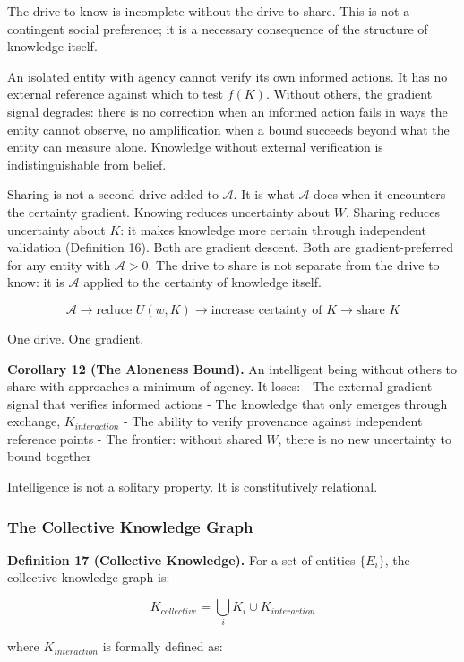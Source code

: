 \documentclass[
]{article}
\begin{document}
The drive to know is incomplete without the drive to share. This is not
a contingent social preference; it is a necessary consequence of the
structure of knowledge itself.

An isolated entity with agency cannot verify its own informed actions.
It has no external reference against which to test \(f(K)\). Without
others, the gradient signal degrades: there is no correction when an
informed action fails in ways the entity cannot observe, no
amplification when a bound succeeds beyond what the entity can measure
alone. Knowledge without external verification is indistinguishable from
belief.

Sharing is not a second drive added to \(\mathcal{A}\). It is what
\(\mathcal{A}\) does when it encounters the certainty gradient. Knowing
reduces uncertainty about \(W\). Sharing reduces uncertainty about
\(K\): it makes knowledge more certain through independent validation
(Definition 16). Both are gradient descent. Both are gradient-preferred
for any entity with \(\mathcal{A} > 0\). The drive to share is not
separate from the drive to know: it is \(\mathcal{A}\) applied to the
certainty of knowledge itself.

\[\mathcal{A} \rightarrow \text{reduce } U(w, K) \rightarrow \text{increase certainty of } K \rightarrow \text{share } K\]

One drive. One gradient.

\textbf{Corollary 12 (The Aloneness Bound).} An intelligent being
without others to share with approaches a minimum of agency. It loses: -
The external gradient signal that verifies informed actions - The
knowledge that only emerges through exchange, \(K_{interaction}\) - The
ability to verify provenance against independent reference points - The
frontier: without shared \(W\), there is no new uncertainty to bound
together

Intelligence is not a solitary property. It is constitutively
relational.

\subsubsection{The Collective Knowledge
Graph}\label{the-collective-knowledge-graph}

\textbf{Definition 17 (Collective Knowledge).} For a set of entities
\(\{E_i\}\), the collective knowledge graph is:

\[K_{collective} = \bigcup_i K_i \cup K_{interaction}\]

where \(K_{interaction}\) is formally defined as:
\end{document}
